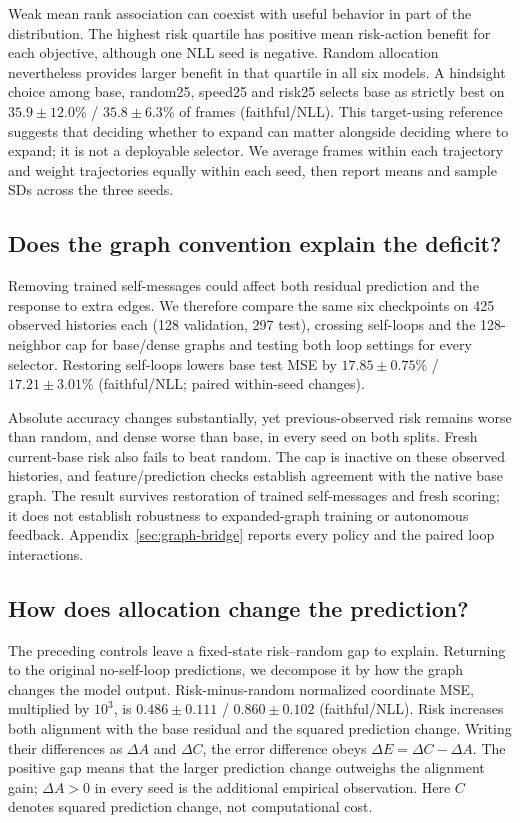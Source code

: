Weak mean rank association can coexist with useful behavior in part of the distribution. The highest risk quartile has positive mean risk-action benefit for each objective, although one NLL seed is negative. Random allocation nevertheless provides larger benefit in that quartile in all six models. A hindsight choice among base, random25, speed25 and risk25 selects base as strictly best on $35.9\pm12.0$\% / $35.8\pm6.3$\% of frames (faithful/NLL). This target-using reference suggests that deciding whether to expand can matter alongside deciding where to expand; it is not a deployable selector. We average frames within each trajectory and weight trajectories equally within each seed, then report means and sample SDs across the three seeds.

\subsection{Does the graph convention explain the deficit?}
Removing trained self-messages could affect both residual prediction and the response to extra edges. We therefore compare the same six checkpoints on 425 observed histories each (128 validation, 297 test), crossing self-loops and the 128-neighbor cap for base/dense graphs and testing both loop settings for every selector. Restoring self-loops lowers base test MSE by $17.85\pm0.75$\% / $17.21\pm3.01$\% (faithful/NLL; paired within-seed changes).

Absolute accuracy changes substantially, yet previous-observed risk remains worse than random, and dense worse than base, in every seed on both splits. Fresh current-base risk also fails to beat random. The cap is inactive on these observed histories, and feature/prediction checks establish agreement with the native base graph. The result survives restoration of trained self-messages and fresh scoring; it does not establish robustness to expanded-graph training or autonomous feedback. Appendix~\ref{sec:graph-bridge} reports every policy and the paired loop interactions.

\subsection{How does allocation change the prediction?}
The preceding controls leave a fixed-state risk--random gap to explain. Returning to the original no-self-loop predictions, we decompose it by how the graph changes the model output. Risk-minus-random normalized coordinate MSE, multiplied by $10^3$, is $0.486\pm0.111$ / $0.860\pm0.102$ (faithful/NLL). Risk increases both alignment with the base residual and the squared prediction change. Writing their differences as $\Delta A$ and $\Delta C$, the error difference obeys $\Delta E=\Delta C-\Delta A$. The positive gap means that the larger prediction change outweighs the alignment gain; $\Delta A>0$ in every seed is the additional empirical observation. Here $C$ denotes squared prediction change, not computational cost.

